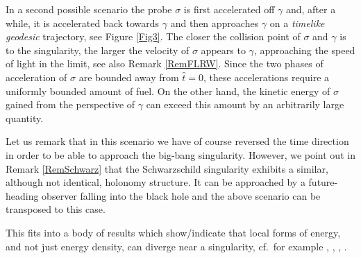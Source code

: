 \documentclass[reqno]{article}
\begin{document}
In a second possible scenario the probe $\sigma$ is first accelerated off $\gamma$ and, after a while, it is accelerated back towards $\gamma$ and then approaches $\gamma$ on a \emph{timelike geodesic} trajectory, see Figure \ref{Fig3}. The closer the collision point of $\sigma$ and $\gamma$ is to the singularity, the larger the velocity of $\sigma$ appears to $\gamma$, approaching the speed of light in the limit, see also Remark \ref{RemFLRW}. Since the two phases of acceleration of $\sigma$ are bounded away from $\hat{t} = 0$, these accelerations require a uniformly bounded amount of fuel. On the other hand, the kinetic energy of $\sigma$ gained from the perspective of $\gamma$ can exceed this amount by an arbitrarily large quantity.

Let us remark that in this scenario we have of course reversed the time direction in order to be able to approach the big-bang singularity. However, we point out  in Remark \ref{RemSchwarz} that the Schwarzschild singularity exhibits a similar, although not identical, holonomy structure. It can be approached by a future-heading observer falling into the black hole and the above scenario can be transposed to this case.

This fits into a  body of results which show/indicate that local forms of energy, and not just energy density, can diverge near a singularity, cf.\ for example \cite{PoiIs89}, \cite{HerHis92}, \cite{LukOh19I}, \cite{FouSbi20}.
\end{document}
